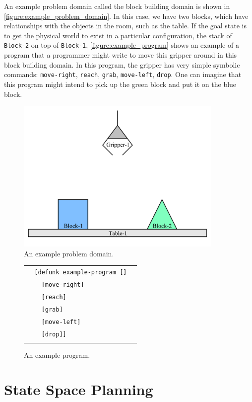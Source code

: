 An example problem domain called the block building domain is shown in
{\mbox{\autoref{figure:example_problem_domain}}}.  In this case, we
have two blocks, which have relationships with the objects in the
room, such as the table.  If the goal state is to get the physical
world to exist in a particular configuration, the stack of {\tt
  Block-2} on top of {\tt Block-1},
{\mbox{\autoref{figure:example_program}}} shows an example of a
program that a programmer might write to move this gripper around in
this block building domain.  In this program, the gripper has very
simple symbolic commands: {\tt move-right}, {\tt reach}, {\tt grab},
{\tt move-left}, {\tt drop}.  One can imagine that this program might
intend to pick up the green block and put it on the blue block.
\begin{figure}
\center
\includegraphics[width=10cm]{gfx/blocks_world_example-1}
\caption{An example problem domain.}
\label{figure:example_problem_domain}
\end{figure}
\begin{figure}
\center
\begin{tabular}{l}
\\
  {\tt ~~[defunk example-program []}~~ \\
  {\tt ~~~~[move-right]} ~~\\
  {\tt ~~~~[reach]} ~~\\
  {\tt ~~~~[grab]} ~~\\
  {\tt ~~~~[move-left]} ~~\\
  {\tt ~~~~[drop]]} ~~\\
\\
\end{tabular}
\caption{An example program.}
\label{figure:example_program}
\end{figure}

\section{State Space Planning}

